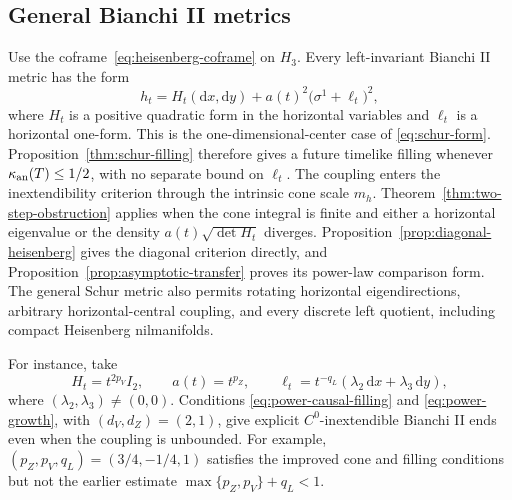 \documentclass[10pt,a4paper]{article}
\numberwithin{equation}{section}
\theoremstyle{definition}
\theoremstyle{remark}
\newcommand{\dd}{\mathrm d}
\begin{document}
\subsection{General Bianchi II metrics}

Use the coframe~\eqref{eq:heisenberg-coframe} on $H_3$.
Every left-invariant Bianchi II metric has the form
\begin{equation}
 h_t=H_t(\dd x,\dd y)+
 a(t)^2\bigl(\sigma^1+\ell_t\bigr)^2,
 \label{eq:general-bII}
\end{equation}
where $H_t$ is a positive quadratic form in the horizontal variables and
$\ell_t$ is a horizontal one-form.  This is the one-dimensional-center case
of \eqref{eq:schur-form}.  Proposition~\ref{thm:schur-filling} therefore gives a
future timelike filling whenever $\kappa_{\rm an}(T)\le1/2$, with no separate
bound on $\ell_t$.  The coupling enters the inextendibility criterion through
the intrinsic cone scale $m_h$.  Theorem~\ref{thm:two-step-obstruction} applies when the cone
integral is finite and either a horizontal eigenvalue or the density
$a(t)\sqrt{\det H_t}$ diverges.  Proposition~\ref{prop:diagonal-heisenberg}
gives the diagonal criterion directly, and
Proposition~\ref{prop:asymptotic-transfer} proves its power-law comparison
form.  The general Schur metric also permits rotating horizontal
eigendirections, arbitrary horizontal-central coupling, and every discrete
left quotient, including compact Heisenberg nilmanifolds.

For instance, take
\[
 H_t=t^{2p_V}I_2,\qquad a(t)=t^{p_Z},\qquad
 \ell_t=t^{-q_L}(\lambda_2\,\dd x+\lambda_3\,\dd y),
\]
where $(\lambda_2,\lambda_3)\ne(0,0)$.  Conditions
\eqref{eq:power-causal-filling} and \eqref{eq:power-growth}, with
$(d_V,d_Z)=(2,1)$, give explicit $C^0$-inextendible Bianchi II ends even when
the coupling is unbounded.  For example,
$(p_Z,p_V,q_L)=(3/4,-1/4,1)$ satisfies the improved cone and filling
conditions but not the earlier estimate
$\max\{p_Z,p_V\}+q_L<1$.
\end{document}
